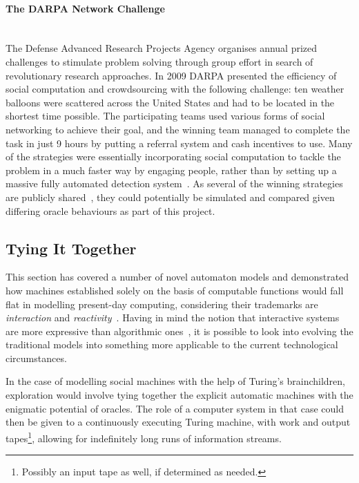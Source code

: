 \documentclass[12pt]{article}
\begin{document}
			\paragraph{The DARPA Network Challenge}\hfill\\
			The Defense Advanced Research Projects Agency organises annual prized challenges to stimulate problem solving through group effort in search of revolutionary research approaches. In 2009 DARPA presented the efficiency of social computation and crowdsourcing with the following challenge: ten weather balloons were scattered across the United States and had to be located in the shortest time possible. The participating teams used various forms of social networking to achieve their goal, and the winning team managed to complete the task in just 9 hours by putting a referral system and cash incentives to use. Many of the strategies were essentially incorporating social computation to tackle the problem in a much faster way by engaging people, rather than by setting up a massive fully automated detection system~\cite{Robertson2013}. As several of the winning strategies are publicly shared~\cite{tang2011reflecting}, they could potentially be simulated and compared given differing oracle behaviours as part of this project.
		
		\subsection{Tying It Together}
				This section has covered a number of novel automaton models and demonstrated how machines established solely on the basis of computable functions would fall flat in modelling present-day computing, considering their trademarks are \textit{interaction} and \textit{reactivity}~\cite{Goldin2004}. Having in mind the notion that interactive systems are more expressive than algorithmic ones~\cite{Wegner1997}, it is possible to look into evolving the traditional models into something more applicable to the current technological circumstances.
				 
				In the case of modelling social machines with the help of Turing's brainchildren, exploration would involve tying together the explicit automatic machines with the enigmatic potential of oracles.
				The role of a computer system in that case could then be given to a continuously executing Turing machine, with work and output tapes\footnote{Possibly an input tape as well, if determined as needed.}, allowing for indefinitely long runs of information streams.
				
\end{document}
